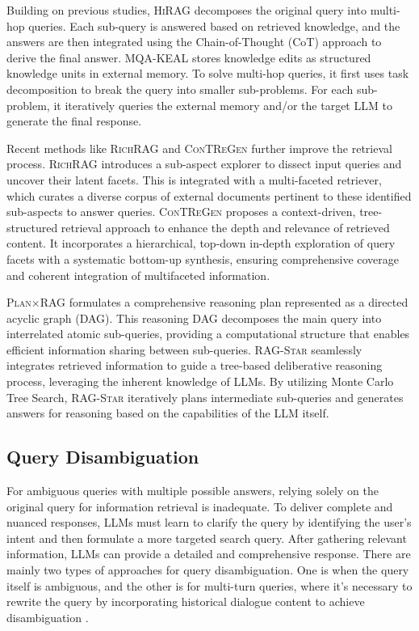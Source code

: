 \documentclass[11pt]{article}
\begin{document}
Building on previous studies, \textsc{HiRAG} \cite{HiRAG} decomposes the original query into multi-hop queries. Each sub-query is answered based on retrieved knowledge, and the answers are then integrated using the Chain-of-Thought (CoT) approach to derive the final answer. \textsc{MQA-KEAL} \cite{MQA-KEAL} stores knowledge edits as structured knowledge units in external memory. To solve multi-hop queries, it first uses task decomposition to break the query into smaller sub-problems. For each sub-problem, it iteratively queries the external memory and/or the target LLM to generate the final response.

Recent methods like \textsc{RichRAG} \cite{RichRAG} and \textsc{ConTReGen} \cite{ConTReGen} further improve the retrieval process. \textsc{RichRAG} introduces a sub-aspect explorer to dissect input queries and uncover their latent facets. This is integrated with a multi-faceted retriever, which curates a diverse corpus of external documents pertinent to these identified sub-aspects to answer queries. \textsc{ConTReGen} proposes a context-driven, tree-structured retrieval approach to enhance the depth and relevance of retrieved content. It incorporates a hierarchical, top-down in-depth exploration of query facets with a systematic bottom-up synthesis, ensuring comprehensive coverage and coherent integration of multifaceted information.

\textsc{Plan×RAG} \cite{plantimesrag} formulates a comprehensive reasoning plan represented as a directed acyclic graph (DAG). This reasoning DAG decomposes the main query into interrelated atomic sub-queries, providing a computational structure that enables efficient information sharing between sub-queries. \textsc{RAG-Star} \cite{RAG-Star} seamlessly integrates retrieved information to guide a tree-based deliberative reasoning process, leveraging the inherent knowledge of LLMs. By utilizing Monte Carlo Tree Search, \textsc{RAG-Star} iteratively plans intermediate sub-queries and generates answers for reasoning based on the capabilities of the LLM itself.


\subsection{Query Disambiguation}\label{Disambiguation}
For ambiguous queries with multiple possible answers, relying solely on the original query for information retrieval is inadequate. To deliver complete and nuanced responses, LLMs must learn to clarify the query by identifying the user's intent and then formulate a more targeted search query. After gathering relevant information, LLMs can provide a detailed and comprehensive response. There are mainly two types of approaches for query disambiguation. One is when the query itself is ambiguous, and the other is for multi-turn queries, where it's necessary to rewrite the query by incorporating historical dialogue content to achieve disambiguation \cite{BEQUE, RaFe}.
\end{document}
